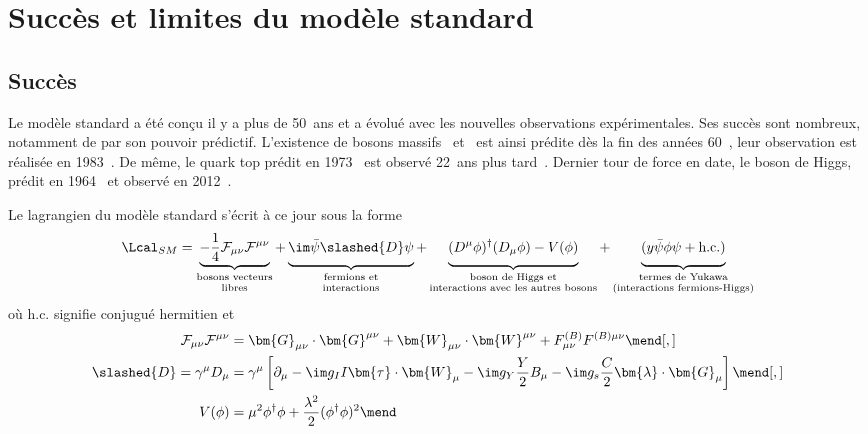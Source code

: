 \section{Succès et limites du modèle standard}\label{chapter-MS-MSSM-section-succes_limites}
\subsection{Succès}\label{chapter-MS-MSSM-section-succes_limites-subsec-succes}
Le modèle standard a été conçu il y a plus de 50~ans et a évolué avec les nouvelles observations expérimentales.
Ses succès sont nombreux, notamment de par son pouvoir prédictif.
L'existence de bosons massifs \Wboson\ et \Zboson\ est ainsi prédite dès la fin des années 60~\cite{Weinberg_leptons_model}, leur observation est réalisée en 1983~\cite{Wboson_discovery1,Wboson_discovery2,Zboson_discovery1,Zboson_discovery2,Wboson_discovery3}.
De même, le quark top prédit en 1973~\cite{CKM_KM} est observé 22~ans plus tard~\cite{top_discovery1,top_discovery2}.
Dernier tour de force en date, le boson de Higgs, prédit en 1964~\cite{Englert_Brout,Higgs_1,Higgs_2,Guralnik_Hagen_Kibble} et observé en 2012~\cite{ATLAS_Higgs_discovery,CMS_Higgs_discovery}.
\par Le lagrangien du modèle standard s'écrit à ce jour sous la forme
\begin{equation}
\Lcal_{SM} = 
\underbrace{- \frac{1}{4} \mathcal{F}_{\mu\nu}\mathcal{F}^{\mu\nu} \vphantom{\frac{1}{4}}}_{\substack{\text{bosons vecteurs\vphantom{YHg}}\\\text{libres\vphantom{(lHg)}}}}
+ \underbrace{\im \bar{\psi} \slashed{D} \psi \vphantom{\frac{1}{4}}}_{\substack{\text{fermions et\vphantom{YHg}}\\\text{interactions\vphantom{(lHg)}}}}
+ \underbrace{(D^\mu\phi)^\dagger(D_\mu\phi) - V(\phi) \vphantom{\frac{1}{4}}}_{\substack{\text{boson de Higgs et\vphantom{YHg}}\\\text{interactions avec les autres bosons\vphantom{(lHg)}}}}
+ \underbrace{(y \bar{\psi}\phi\psi + \text{h.c.}) \vphantom{\frac{1}{4}}}_{\substack{\text{termes de Yukawa\vphantom{YHg}}\\\text{(interactions fermions-Higgs)\vphantom{(lHg)}}}}
\label{eq-SM_lagrangian}
\end{equation}
où \og $\text{h.c.}$ \fg{} signifie conjugué hermitien et
\begin{align}
\mathcal{F}_{\mu\nu}\mathcal{F}^{\mu\nu} &= \bm{G}_{\mu\nu} \cdot \bm{G}^{\mu\nu} + \bm{W}_{\mu\nu} \cdot \bm{W}^{\mu\nu} + F^{(B)}_{\mu\nu} F^{(B)\mu\nu}
\mend[,]\\
\slashed{D} = \gamma^\mu D_\mu &= \gamma^\mu \left[ \partial_\mu - \im g_I I \bm{\tau}\cdot\bm{W}_\mu - \im g_Y \frac{Y}{2} B_\mu - \im g_s \frac{C}{2} \bm{\lambda}\cdot\bm{G}_\mu \right]
\mend[,]\\
V(\phi) &= \mu^2\phi^\dagger\phi + \frac{\lambda^2}{2} (\phi^\dagger\phi)^2
\mend
\end{align}
